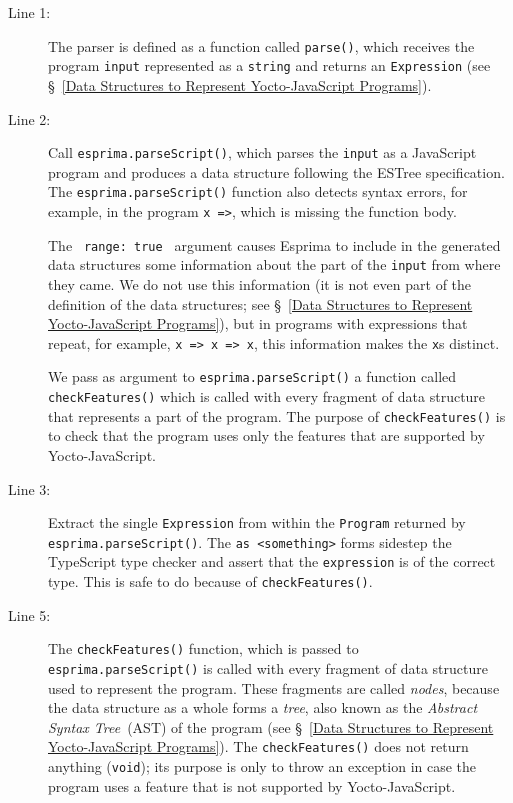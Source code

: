 \documentclass[12pt, oneside]{book}
\begin{document}
\begin{description}
\item [Line 1:]

The parser is defined as a function called \texttt{parse()}, which receives the program \texttt{input} represented as a \texttt{string} and returns an \texttt{Expression} (see §~\ref{Data Structures to Represent Yocto-JavaScript Programs}).

\item [Line 2:]

Call \texttt{esprima.parseScript()}, which parses the \texttt{input} as a JavaScript program and produces a data structure following the ESTree specification. The \texttt{esprima.parseScript()} function also detects syntax errors, for example, in the program \texttt{x =>}, which is missing the function body.

The \texttt{{ range: true }} argument causes Esprima to include in the generated data structures some information about the part of the \texttt{input} from where they came. We do not use this information (it is not even part of the definition of the data structures; see §~\ref{Data Structures to Represent Yocto-JavaScript Programs}), but in programs with expressions that repeat, for example, \texttt{x => x => x}, this information makes the \texttt{x}s distinct.

We pass as argument to \texttt{esprima.parseScript()} a function called \texttt{checkFeatures()} which is called with every fragment of data structure that represents a part of the program. The purpose of \texttt{checkFeatures()} is to check that the program uses only the features that are supported by Yocto-JavaScript.

\item [Line 3:]

Extract the single \texttt{Expression} from within the \texttt{Program} returned by \texttt{esprima.parseScript()}. The \texttt{as <something>} forms sidestep the TypeScript type checker and assert that the \texttt{expression} is of the correct type. This is safe to do because of \texttt{checkFeatures()}.

\item [Line 5:]

The \texttt{checkFeatures()} function, which is passed to \texttt{esprima.parseScript()} is called with every fragment of data structure used to represent the program. These fragments are called \emph{nodes}, because the data structure as a whole forms a \emph{tree}, also known as the \emph{Abstract Syntax Tree}~(AST) of the program (see §~\ref{Data Structures to Represent Yocto-JavaScript Programs}). The \texttt{checkFeatures()} does not return anything (\texttt{void}); its purpose is only to throw an exception in case the program uses a feature that is not supported by Yocto-JavaScript.


\end{description}
\end{document}
